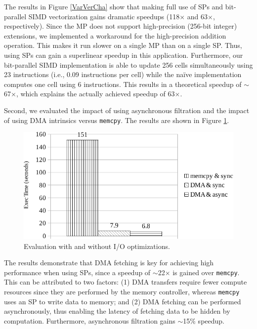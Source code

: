 The results in Figure \ref{VarVerCha} show that making
full use of SPs and bit-parallel SIMD vectorization gains dramatic
speedups (118$\times$ and 63$\times$, respectively). Since the MP does
not support high-precision (256-bit integer) extensions, we
implemented a workaround for the high-precision addition
operation. This makes it run slower on a single MP than on a single
SP. Thus, using SPs can gain a superlinear speedup in this
application. Furthermore, our bit-parallel SIMD implementation is able
to update 256 cells simultaneously using 23 instructions (i.e., 0.09
instructions per cell) while the na\"ive implementation computes one
cell using 6 instructions. This results in a theoretical speedup of
$\sim$67$\times$, which explains the actually achieved speedup of
63$\times$.

Second, we evaluated the impact of using asynchronous filtration and
the impact of using DMA intrinsics versus \texttt{memcpy}. The results
are shown in Figure \ref{VarOptCha}.

\begin{figure}[!htb]
  \begin{center}
    \includegraphics[width=1\linewidth]{figures/VarOptCha}
    \caption{Evaluation with and without I/O optimizations.}
    \label{VarOptCha}
  \end{center}
\end{figure}

The results demonstrate that DMA fetching is key for achieving high
performance when using SPs, since a speedup of $\sim$22$\times$ is
gained over \texttt{memcpy}. This can be attributed to two factors:
(1) DMA transfers require fewer compute resources since they are
performed by the memory controller, whereas \texttt{memcpy} uses an SP
to write data to memory; and (2) DMA fetching can be performed
asynchronously, thus enabling the latency of fetching data to be
hidden by computation. Furthermore, asynchronous filtration gains
$\sim$15\% speedup.

